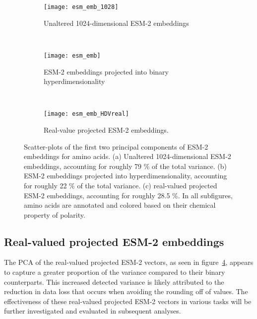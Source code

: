 \begin{figure}[H]
\label{fig:combined_ESM_embeddings}
\centering
\begin{minipage}[b]{.5\textwidth}
    \begin{subfigure}[b]{\textwidth}
    \texttt{[image: esm\_emb\_1028]}
    \caption{Unaltered 1024-dimensional ESM-2 embeddings}
    \label{fig:AAesm_pure}
\end{subfigure}
\end{minipage}
\\
\centering
\begin{minipage}[b]{.5\textwidth}
\begin{subfigure}[b]{\textwidth}
    \texttt{[image: esm\_emb]}
    \caption{ESM-2 embeddings projected into binary hyperdimensionality}
    \label{fig:AAesm}
\end{subfigure}
\end{minipage}
\\
\centering
\begin{minipage}[b]{.5\textwidth}
\begin{subfigure}[b]{\textwidth}
    \texttt{[image: esm\_emb\_HDVreal]}
    \caption{Real-value projected ESM-2 embeddings.}\label{fig:AAesmreal}
\end{subfigure}
\end{minipage}
\caption{Scatter-plots of the first two principal components of ESM-2 embeddings for amino acids. (a) Unaltered 1024-dimensional ESM-2 embeddings, accounting for roughly 79 \% of the total variance. (b) ESM-2 embeddings projected into hyperdimensionality, accounting for roughly 22 \% of the total variance. (c) real-valued projected ESM-2 embeddings, accounting for roughly 28.5 \%. In all subfigures, amino acids are annotated and colored based on their chemical property of polarity.}
\end{figure}

\subsection*{Real-valued projected ESM-2 embeddings}
The PCA of the real-valued projected ESM-2 vectors, as seen in figure~\ref{fig:AAesmreal}, appears to capture a greater proportion of the variance compared to their binary counterparts. This increased detected variance is likely attributed to the reduction in data loss that occurs when avoiding the rounding off of values. The effectiveness of these real-valued projected ESM-2 vectors in various tasks will be further investigated and evaluated in subsequent analyses.

